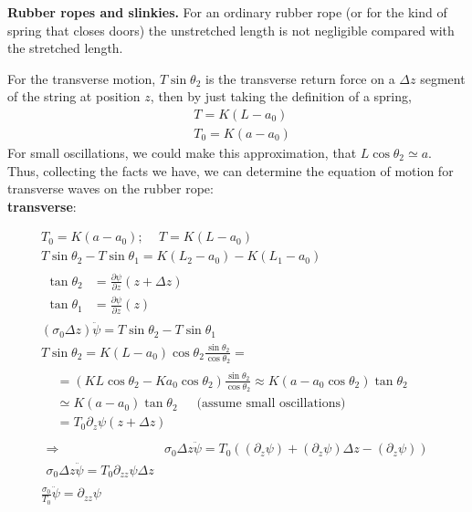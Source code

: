 \documentclass[twoside,10pt]{amsart}
\newcommand{\problemhead}[1]
  {\smallskip
   \noindent{\large\bf Problem #1.}
   \smallskip}
\begin{document}
\problemhead{4.30} \textbf{ Rubber ropes and slinkies.}  For an ordinary rubber rope (or for the kind of spring that closes doors) the unstretched length is not negligible compared with the stretched length.  

For the transverse motion, $T \sin{ \theta_2}$ is the transverse return force on a $\Delta z$ segment of the string at position $z$, then by just taking the definition of a spring,
\[
\begin{aligned}
  &  T = K(L-a_0) \\
  &  T_0 = K(a-a_0)
\end{aligned}
\]
For small oscillations, we could make this approximation, that $L \cos{\theta_2} \simeq a$.  \\

Thus, collecting the facts we have, we can determine the equation of motion for transverse waves on the rubber rope: \\
\textbf{transverse}:

\[
\begin{gathered}
  T_0 = K(a-a_0) ; \quad \, T = K(L-a_0) \\
  T\sin{ \theta_2} - T \sin{ \theta_1} = K (L_2 - a_0) - K(L_1 - a_0) \\
  \begin{aligned}
    \tan{ \theta_2} & = \frac{ \partial \psi}{ \partial z }(z+\Delta z) \\
    \tan{ \theta_1} & = \frac{ \partial \psi}{ \partial z } (z) 
  \end{aligned} \\
  (\sigma_0 \Delta z) \ddot{\psi} = T \sin{ \theta_2} - T \sin{\theta_1} \\
  T\sin{ \theta_2} = K(L-a_0) \cos{ \theta_2} \frac{ \sin{ \theta_2} }{ \cos{ \theta_2} } = \\
  \begin{aligned}
    & = (KL \cos{ \theta_2} - Ka_0 \cos{ \theta_2} ) \frac{ \sin{ \theta_2}}{ \cos{ \theta_2} } \approx K(a - a_0 \cos{\theta_2} ) \tan{\theta_2} \\
    & \simeq K(a-a_0) \tan{ \theta_2} \quad \, \text{ (assume small oscillations) } \\
    & = T_0 \partial_z \psi(z+\Delta z) 
  \end{aligned}\\
\begin{aligned}
  \Longrightarrow & \sigma_0 \Delta z \ddot{\psi} = T_0 ( (\partial_z \psi) + (\partial_z \psi) \Delta z - (\partial_z \psi) ) \\
  \sigma_0 \Delta z \ddot{\psi} = T_0 \partial_{zz} \psi \Delta z 
\end{aligned} \\
\boxed{ \frac{ \sigma_0}{T_0} \ddot{\psi} = \partial_{zz} \psi }
\end{gathered}
\]
\end{document}
